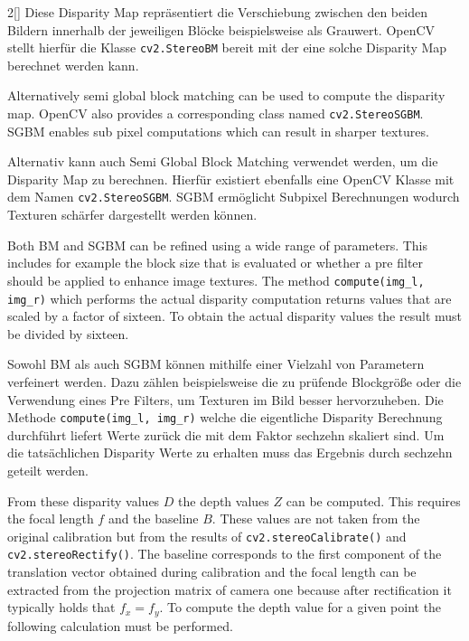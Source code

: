 \begin{paracol}{2}[]
Diese Disparity Map repräsentiert die Verschiebung zwischen den beiden Bildern innerhalb der jeweiligen Blöcke beispielsweise als Grauwert. OpenCV stellt hierfür die Klasse \texttt{cv2.StereoBM} bereit mit der eine solche Disparity Map berechnet werden kann.

\coleng

Alternatively semi global block matching can be used to compute the disparity map. OpenCV also provides a corresponding class named \texttt{cv2.StereoSGBM}. SGBM enables sub pixel computations which can result in sharper textures.

\colger

Alternativ kann auch Semi Global Block Matching verwendet werden, um die Disparity Map zu berechnen. Hierfür existiert ebenfalls eine OpenCV Klasse mit dem Namen \texttt{cv2.StereoSGBM}. SGBM ermöglicht Subpixel Berechnungen wodurch Texturen schärfer dargestellt werden können.

\coleng

Both BM and SGBM can be refined using a wide range of parameters. This includes for example the block size that is evaluated or whether a pre filter should be applied to enhance image textures. The method \texttt{compute(img\_l, img\_r)} which performs the actual disparity computation returns values that are scaled by a factor of sixteen. To obtain the actual disparity values the result must be divided by sixteen.

\colger

Sowohl BM als auch SGBM können mithilfe einer Vielzahl von Parametern verfeinert werden. Dazu zählen beispielsweise die zu prüfende Blockgröße oder die Verwendung eines Pre Filters, um Texturen im Bild besser hervorzuheben. Die Methode \texttt{compute(img\_l, img\_r)} welche die eigentliche Disparity Berechnung durchführt liefert Werte zurück die mit dem Faktor sechzehn skaliert sind. Um die tatsächlichen Disparity Werte zu erhalten muss das Ergebnis durch sechzehn geteilt werden.

\coleng

From these disparity values $D$ the depth values $Z$ can be computed. This requires the focal length $f$ and the baseline $B$. These values are not taken from the original calibration but from the results of \texttt{cv2.stereoCalibrate()} and \texttt{cv2.stereoRectify()}. The baseline corresponds to the first component of the translation vector obtained during calibration and the focal length can be extracted from the projection matrix of camera one because after rectification it typically holds that $f_x = f_y$. To compute the depth value for a given point the following calculation must be performed.


\end{paracol}
